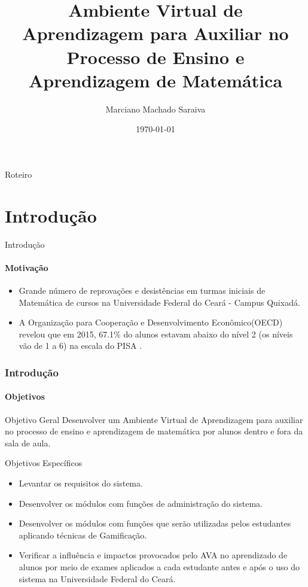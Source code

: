 \documentclass[aspectratio=169]{beamer}
\title{Ambiente Virtual de Aprendizagem para Auxiliar no Processo de Ensino e Aprendizagem de Matemática}
\author{Marciano Machado Saraiva}
\institute{
Orientador: Prof. Me. Samy Soares Passos de Sá\\[2 ex]
Universidade Federal do Ceará
	    \par
	    Bacharel em Sistemas de Informação}
\date{\today}
\begin{document}
\begin{frame}

    \titlepage

\end{frame}

\begin{frame}{Roteiro}
	\tableofcontents
\end{frame}

\section{Introdução}

\begin{frame}{Introdução}
\framesubtitle{Motivação}

\begin{itemize}
	\item Grande número de reprovações e desistências em turmas iniciais de Matemática de cursos na Universidade Federal do Ceará - Campus Quixadá.
	\item A Organização para Cooperação e Desenvolvimento Econômico(OECD) revelou que em 2015, 67.1\% do alunos estavam abaixo do nível 2 (os níveis vão de 1 a 6) na escala do PISA \cite{pisainfocus2016}.

\end{itemize}

\end{frame}

\begin{frame}
\frametitle{Introdução}
\framesubtitle{Objetivos}

\begin{block}{Objetivo Geral}
	Desenvolver um Ambiente Virtual de Aprendizagem para auxiliar no processo de ensino e aprendizagem de matemática por alunos dentro e fora da sala de aula.
\end{block}

\begin{block}{Objetivos Específicos}
  \begin{itemize}
  \item Levantar os requisitos do sistema.
  \pause
  \item Desenvolver os módulos com funções de administração do sistema.
  \pause
  \item Desenvolver os módulos com funções que serão utilizadas pelos estudantes aplicando técnicas de Gamificação.
  \pause
  \item Verificar a influência e impactos provocados pelo AVA no aprendizado de alunos por meio de exames aplicados a cada estudante antes e após o uso do sistema na Universidade Federal do Ceará.
\end{itemize}
\end{block}

\end{frame}
\end{document}
